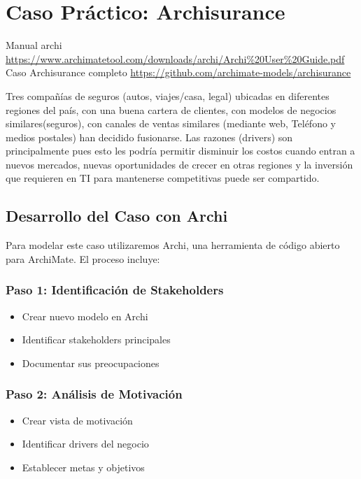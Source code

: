 \section{Caso Práctico: Archisurance}

Manual archi \url{https://www.archimatetool.com/downloads/archi/Archi%20User%20Guide.pdf} 
\\ Caso Archisurance completo \url{https://github.com/archimate-models/archisurance} \\

\begin{tcolorbox}[colback=gray!5!white,colframe=orange!60!gray,title=Archisurance]
Tres compañías de seguros (autos, viajes/casa, legal) ubicadas en diferentes regiones del país, con una buena cartera de clientes, con modelos de negocios similares(seguros), con canales de ventas similares (mediante web, Teléfono y medios postales) han decidido fusionarse. Las razones (drivers) son principalmente pues esto les podría permitir disminuir los costos cuando entran a nuevos mercados, nuevas oportunidades de crecer en otras regiones y la inversión que requieren en TI para mantenerse competitivas puede ser compartido.
\end{tcolorbox}

\subsection{Desarrollo del Caso con Archi}

Para modelar este caso utilizaremos Archi, una herramienta de código abierto para ArchiMate. El proceso incluye:

\subsubsection{Paso 1: Identificación de Stakeholders}
\begin{itemize}
\item Crear nuevo modelo en Archi
\item Identificar stakeholders principales
\item Documentar sus preocupaciones
\end{itemize}

\subsubsection{Paso 2: Análisis de Motivación}
\begin{itemize}
\item Crear vista de motivación
\item Identificar drivers del negocio
\item Establecer metas y objetivos
\end{itemize}

